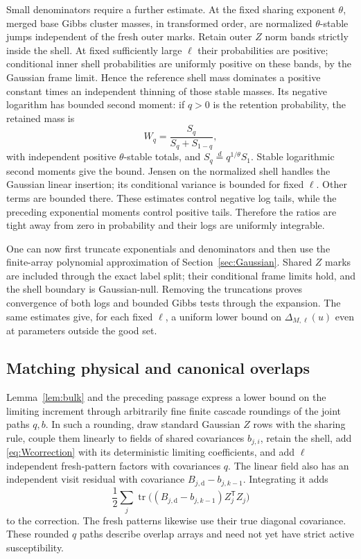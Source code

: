 \documentclass[11pt]{article}
\numberwithin{equation}{section}
\theoremstyle{definition}
\newcommand{\tr}{\operatorname{tr}}
\begin{document}
Small denominators require a further estimate. At the fixed sharing exponent $\theta$, merged base Gibbs cluster masses, in transformed order, are normalized $\theta$-stable jumps independent of the fresh outer marks. Retain outer $Z$ norm bands strictly inside the shell. At fixed sufficiently large $\ell$ their probabilities are positive; conditional inner shell probabilities are uniformly positive on these bands, by the Gaussian frame limit. Hence the reference shell mass dominates a positive constant times an independent thinning of those stable masses. Its negative logarithm has bounded second moment: if $q>0$ is the retention probability, the retained mass is
\begin{equation}\label{eq:thinning}
W_q=\frac{S_q}{S_q+S_{1-q}},
\end{equation}
with independent positive $\theta$-stable totals, and $S_q\stackrel d=q^{1/\theta}S_1$. Stable logarithmic second moments give the bound. Jensen on the normalized shell handles the Gaussian linear insertion; its conditional variance is bounded for fixed $\ell$. Other terms are bounded there. These estimates control negative log tails, while the preceding exponential moments control positive tails. Therefore the ratios are tight away from zero in probability and their logs are uniformly integrable.

One can now first truncate exponentials and denominators and then use the finite-array polynomial approximation of Section~\ref{sec:Gaussian}. Shared $Z$ marks are included through the exact label split; their conditional frame limits hold, and the shell boundary is Gaussian-null. Removing the truncations proves convergence of both logs and bounded Gibbs tests through the expansion. The same estimates give, for each fixed $\ell$, a uniform lower bound on $\Delta_{M,\ell}(u)$ even at parameters outside the good set.

\subsection{Matching physical and canonical overlaps}
Lemma~\ref{lem:bulk} and the preceding passage express a lower bound on the limiting increment through arbitrarily fine finite cascade roundings of the joint paths $q,b$. In such a rounding, draw standard Gaussian $Z$ rows with the sharing rule, couple them linearly to fields of shared covariances $b_{j,i}$, retain the shell, add \eqref{eq:Wcorrection} with its deterministic limiting coefficients, and add $\ell$ independent fresh-pattern factors with covariances $q$. The linear field also has an independent visit residual with covariance $B_{j,\mathrm d}-b_{j,k-1}$. Integrating it adds
\[
\frac12\sum_j\tr\big((B_{j,\mathrm d}-b_{j,k-1})Z_j^{\mathsf T}Z_j\big)
\]
to the correction. The fresh patterns likewise use their true diagonal covariance. These rounded $q$ paths describe overlap arrays and need not yet have strict active susceptibility.
\end{document}
